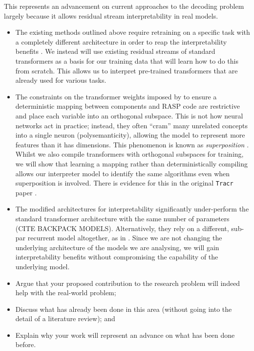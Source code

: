 \documentclass[11pt]{scrartcl}
\begin{document}
This represents an advancement on current approaches to the decoding problem largely because it allows residual stream interpretability in real models. 
\begin{itemize}
\item The existing methods outlined above require retraining on a specific task with a completely different architecture in order to reap the interpretability benefits \cite{friedman2024learning, michaud2024opening, tamkin2023codebook, liao2023generating}. \color{green}We instead will use existing residual streams of standard transformers as a basis for our training data that will learn how to do this from scratch. This allows us to interpret pre-trained transformers that are already used for various tasks. \color{black} 
\item The constraints on the transformer weights imposed by \textcite{friedman2024learning} to ensure a deterministic mapping between components and RASP code are restrictive and place each variable into an orthogonal subspace. This is not how neural networks act in practice; instead, they often ``cram'' many unrelated concepts into a single neuron (polysemanticity), allowing the model to represent more features than it has dimensions. This phenomenon is known as \textit{superposition} \cite{elhage2022toy}. \color{green} Whilst we also compile transformers with orthogonal subspaces for training, we will show that learning a mapping rather than deterministically compiling allows our interpreter model to identify the same algorithms even when superposition is involved. There is evidence for this in the original \texttt{Tracr} paper \cite{lindner2024tracr}. \color{black}
\item The modified architectures for interpretability significantly under-perform the standard transformer architecture with the same number of parameters \cite{friedman2024learning} (CITE BACKPACK MODELS). Alternatively, they rely on a different, sub-par recurrent model altogether, as in \cite{michaud2024opening}. \color{green} Since we are not changing the underlying architecture of the models we are analysing, we will gain interpretability benefits without compromising the capability of the underlying model. 
\end{itemize}

\color{blue}
\begin{itemize}
\item Argue that your proposed contribution to the research problem will indeed
help with the real-world problem;
\item Discuss what has already been done in this area (without going into the detail of a literature review); and
\item Explain why your work will represent an advance on what has been done
before.
\end{itemize}
\color{black}
\end{document}
